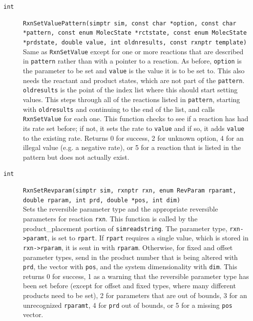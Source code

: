\documentclass {scrbook}
\newcommand {\ttt} {\texttt}
\begin{document}
\begin{description}
\item[\ttt{int}]
\ttt{RxnSetValuePattern(simptr sim, const char *option, const char *pattern, const enum MolecState *rctstate, const enum MolecState *prdstate, double value, int oldnresults, const rxnptr template)} \\
Same as \ttt{RxnSetValue} except for one or more reactions that are described in \ttt{pattern} rather than with a pointer to a reaction. As before, \ttt{option} is the parameter to be set and \ttt{value} is the value it is to be set to. This also needs the reactant and product states, which are not part of the \ttt{pattern}. \ttt{oldresults} is the point of the index list where this should start setting values. This steps through all of the reactions listed in \ttt{pattern}, starting with \ttt{oldresults} and continuing to the end of the list, and calls \ttt{RxnSetValue} for each one. This function checks to see if a reaction has had its rate set before; if not, it sets the rate to \ttt{value} and if so, it adds \ttt{value} to the existing rate. Returns 0 for success, 2 for unknown option, 4 for an illegal value (e.g. a negative rate), or 5 for a reaction that is listed in the pattern but does not actually exist.

\item[\ttt{int}]
\ttt{RxnSetRevparam(simptr sim, rxnptr rxn, enum RevParam rparamt, double rparam, int prd, double *pos, int dim)} \\
Sets the reversible parameter type and the appropriate reversible parameters for reaction \ttt{rxn}. This function is called by the product\_placement portion of \ttt{simreadstring}. The parameter type, \ttt{rxn->paramt}, is set to \ttt{rpart}. If \ttt{rpart} requires a single value, which is stored in \ttt{rxn->rparam}, it is sent in with \ttt{rparam}. Otherwise, for fixed and offset parameter types, send in the product number that is being altered with \ttt{prd}, the vector with \ttt{pos}, and the system dimensionality with \ttt{dim}. This returns 0 for success, 1 as a warning that the reversible parameter type has been set before (except for offset and fixed types, where many different products need to be set), 2 for parameters that are out of bounds, 3 for an unrecognized \ttt{rparamt}, 4 for \ttt{prd} out of bounds, or 5 for a missing \ttt{pos} vector.


\end{description}
\end{document}
